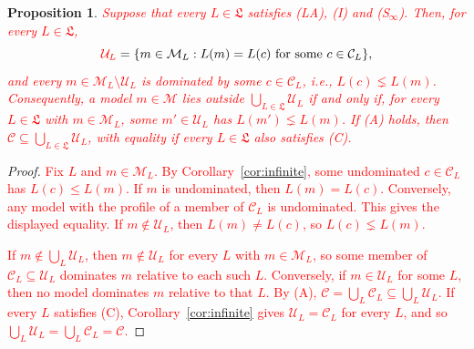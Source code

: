 \documentclass[11pt]{article}
\newtheorem{proposition}[theorem]{Proposition}
\theoremstyle{definition}
\theoremstyle{remark}
\newcommand{\M}{\mathcal M}
\newcommand{\C}{\mathcal C}
\newcommand{\U}{\mathcal U}
\begin{document}
\begin{proposition}\label{prop:permissible}
\textcolor{red}{Suppose that every $L\in\mathfrak L$ satisfies (LA), (I) and (S$_\infty$). Then, for every $L\in\mathfrak L$,}
\[
 \textcolor{red}{\U_L}=\{m\in\M_L:L(m)=L(c)\text{ for some }c\in\C_L\},
\]
\textcolor{red}{and every $m\in\M_L\setminus\U_L$ is dominated by some $c\in\C_L$, \textit{i.e.}, $L(c)\lneq L(m)$. Consequently, a model $m\in\M$ lies outside $\bigcup_{L\in\mathfrak L}\U_L$ if and only if, for every $L\in\mathfrak L$ with $m\in\M_L$, some $m'\in\U_L$ has $L(m')\lneq L(m)$. If (A) holds, then $\C\subseteq\bigcup_{L\in\mathfrak L}\U_L$, with equality if every $L\in\mathfrak L$ also satisfies (C).}
\end{proposition}
\begin{proof}
\textcolor{red}{Fix $L$ and $m\in\M_L$. By Corollary~\ref{cor:infinite}, some undominated $c\in\C_L$ has $L(c)\le L(m)$. If $m$ is undominated, then $L(m)=L(c)$. Conversely, any model with the profile of a member of $\C_L$ is undominated. This gives the displayed equality. If $m\notin\U_L$, then $L(m)\ne L(c)$, so $L(c)\lneq L(m)$.}

\textcolor{red}{If $m\notin\bigcup_L\U_L$, then $m\notin\U_L$ for every $L$ with $m\in\M_L$, so some member of $\C_L\subseteq\U_L$ dominates $m$ relative to each such $L$. Conversely, if $m\in\U_L$ for some $L$, then no model dominates $m$ relative to that $L$. By (A), $\C=\bigcup_L\C_L\subseteq\bigcup_L\U_L$. If every $L$ satisfies (C), Corollary~\ref{cor:infinite} gives $\U_L=\C_L$ for every $L$, and so $\bigcup_L\U_L=\bigcup_L\C_L=\C$.}
\end{proof}
\end{document}
